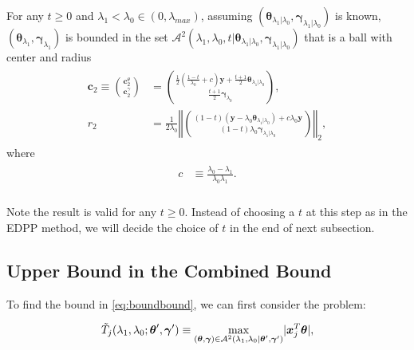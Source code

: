 \begin{theorem}
    \label{thm:1.2}
    For any $t\geq0$ and $\lambda_1<\lambda_{0}\in (0,\lambda_{max})$, assuming $(\boldsymbol\theta_{\lambda_1|\lambda_0},\boldsymbol\gamma_{\lambda_1|\lambda_0})$ is known, $(\boldsymbol\theta_{\lambda_1},\boldsymbol\gamma_{\lambda_1})$ is bounded in the set $\mathcal{A}^2(\lambda_1,\lambda_0,t|\boldsymbol\theta_{\lambda_1|\lambda_0},\boldsymbol\gamma_{\lambda_1|\lambda_0})$ that is a ball with center and radius
    \begin{gather}
        \begin{aligned}
            \boldsymbol c_2\equiv\binom{\boldsymbol c_2^\theta}{\boldsymbol c_2^\gamma}&=\binom{\frac{1}{2}(\frac{1-t}{\lambda_0}+c)\boldsymbol y+\frac{t+1}{2}\boldsymbol\theta_{\lambda_1|\lambda_0}}{\frac{t+1}{2}\boldsymbol\gamma_{\lambda_0}},\\
            r_2&=\frac{1}{2\lambda_0}\left\Vert\binom{(1-t)(\boldsymbol y-\lambda_0\boldsymbol\theta_{\lambda_1|\lambda_0})+c\lambda_0\boldsymbol y}{(1-t)\lambda_0\boldsymbol\gamma_{\lambda_1|\lambda_0}}\right\Vert_2,
        \end{aligned}
    \end{gather}
    where
    \begin{gather}
        \begin{aligned}
            c&\equiv\frac{\lambda_0-\lambda_1}{\lambda_0\lambda_1}.\\
        \end{aligned}
    \end{gather}
\end{theorem}

Note the result is valid for any $t\geq 0$. Instead of choosing a $t$ at this step as in the EDPP method, we will decide the choice of $t$ in the end of next subsection.

\subsection{Upper Bound in the Combined Bound}


To find the bound in \eqref{eq:boundbound}, we can first consider the problem:

\begin{equation}
    \Tilde{T}_j(\lambda_1,\lambda_0;\boldsymbol\theta',\boldsymbol\gamma')\equiv\underset{(\boldsymbol\theta,\boldsymbol\gamma)\in\mathcal{A}^2(\lambda_1,\lambda_0|\boldsymbol\theta',\boldsymbol\gamma')}{\mathrm{max}}|\boldsymbol x_j^T\boldsymbol\theta|,
\end{equation}

